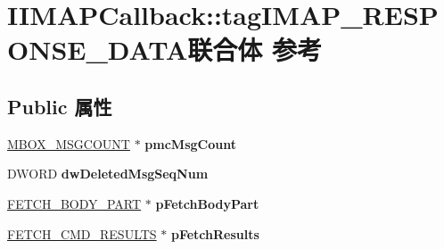 \hypertarget{union_i_i_m_a_p_callback_1_1tag_i_m_a_p___r_e_s_p_o_n_s_e___d_a_t_a}{}\section{I\+I\+M\+A\+P\+Callback\+:\+:tag\+I\+M\+A\+P\+\_\+\+R\+E\+S\+P\+O\+N\+S\+E\+\_\+\+D\+A\+T\+A联合体 参考}
\label{union_i_i_m_a_p_callback_1_1tag_i_m_a_p___r_e_s_p_o_n_s_e___d_a_t_a}
\subsection*{Public 属性}
\begin{DoxyCompactItemize}
\item 
\mbox{\label{union_i_i_m_a_p_callback_1_1tag_i_m_a_p___r_e_s_p_o_n_s_e___d_a_t_a_acbec493c4c358b9609769e57b66307a4}} 
\hyperlink{struct_i_i_m_a_p_callback_1_1tag_m_b_o_x___m_s_g_c_o_u_n_t}{M\+B\+O\+X\+\_\+\+M\+S\+G\+C\+O\+U\+NT} $\ast$ {\bfseries pmc\+Msg\+Count}
\item 
\mbox{\label{union_i_i_m_a_p_callback_1_1tag_i_m_a_p___r_e_s_p_o_n_s_e___d_a_t_a_a06319f6e4736d322141dc76773707388}} 
D\+W\+O\+RD {\bfseries dw\+Deleted\+Msg\+Seq\+Num}
\item 
\mbox{\label{union_i_i_m_a_p_callback_1_1tag_i_m_a_p___r_e_s_p_o_n_s_e___d_a_t_a_aac7026f5483ae77339dcec7f4c8bcecc}} 
\hyperlink{struct_i_i_m_a_p_callback_1_1tag_f_e_t_c_h___b_o_d_y___p_a_r_t}{F\+E\+T\+C\+H\+\_\+\+B\+O\+D\+Y\+\_\+\+P\+A\+RT} $\ast$ {\bfseries p\+Fetch\+Body\+Part}
\item 
\mbox{\label{union_i_i_m_a_p_callback_1_1tag_i_m_a_p___r_e_s_p_o_n_s_e___d_a_t_a_a40a8492e309d0131d84d86e83758dc93}} 
\hyperlink{struct_i_i_m_a_p_callback_1_1tag_f_e_t_c_h___c_m_d___r_e_s_u_l_t_s}{F\+E\+T\+C\+H\+\_\+\+C\+M\+D\+\_\+\+R\+E\+S\+U\+L\+TS} $\ast$ {\bfseries p\+Fetch\+Results}
\item 
\mbox{\label{union_i_i_m_a_p_callback_1_1tag_i_m_a_p___r_e_s_p_o_n_s_e___d_a_t_a_a7202917be42be25266561676701f8ef4}} 

\end{DoxyCompactItemize}
